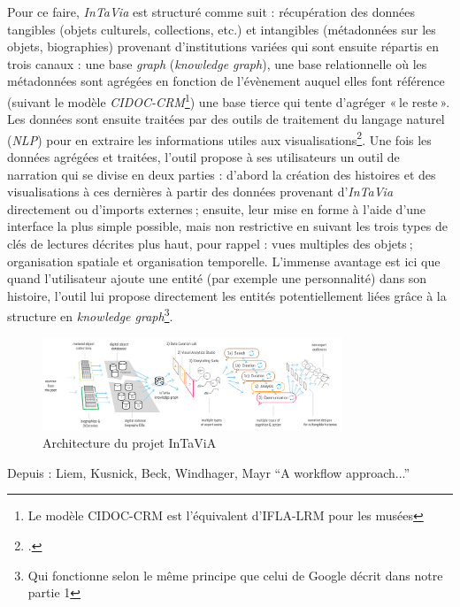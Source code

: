 Pour ce faire, \textit{InTaVia} est structuré comme suit : récupération des données tangibles (objets culturels, collections, etc.) et intangibles (métadonnées sur les objets, biographies) provenant d’institutions variées qui sont ensuite répartis en trois canaux : une base \textit{graph} (\textit{knowledge graph}), une base relationnelle où les métadonnées sont agrégées en fonction de l’évènement auquel elles font référence (suivant le modèle \textit{CIDOC-CRM}\footnote{Le modèle CIDOC-CRM est l'équivalent d'IFLA-LRM pour les musées}) une base tierce qui tente d’agréger « le reste ». Les données sont ensuite traitées par des outils de traitement du langage naturel (\textit{NLP}) pour en extraire les informations utiles aux visualisations\footcite{noauthor_overall_nodate}. Une fois les données agrégées et traitées, l’outil propose à ses utilisateurs un outil de narration qui se divise en deux parties : d’abord la création des histoires et des visualisations à ces dernières à partir des données provenant d’\textit{InTaVia} directement ou d’imports externes ; ensuite, leur mise en forme à l’aide d’une interface la plus simple possible, mais non restrictive en suivant les trois types de clés de lectures décrites plus haut, pour rappel : vues multiples des objets ; organisation spatiale et organisation temporelle. L’immense avantage est ici que quand l’utilisateur ajoute une entité (par exemple une personnalité) dans son histoire, l’outil lui propose directement les entités potentiellement liées grâce à la structure en \textit{knowledge graph}\footnote{Qui fonctionne selon le même principe que celui de Google décrit dans notre partie 1}.


\begin{figure}[h!]
	\centering
	\includegraphics[width=0.8\textwidth]{images/image18.png}
	\caption{Architecture du projet InTaViA}
	\label{fig:image18}
\end{figure}


\begin{center}
	Depuis : Liem, Kusnick, Beck, Windhager, Mayr \enquote{A workflow approach...}
\end{center}

